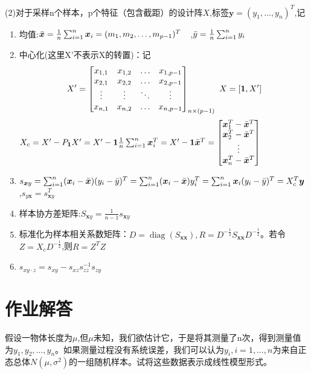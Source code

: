 \documentclass[cn,hazy,green,12pt,normal]{elegantnote}
\DeclareMathOperator{\diag}{diag}
\numberwithin{equation}{section}
\numberwithin{subsection}{section}
\begin{document}
(2)对于采样n个样本，p个特征（包含截距）的设计阵$X$,标签$\bm y=(y_1,\dots,y_n)^T$,记
\begin{enumerate}
    \item 均值:$\Bar{\bm x}=\frac{1}{n}\sum_{i=1}^{n}\bm x_i=(m_1,m_2,\dots,m_{p-1})^T\quad$,$\Bar{y}=\frac{1}{n}\sum_{i=1}^{n}y_i$
    \item 中心化(这里X'不表示X的转置)：记
    \[
    X'=\begin{bmatrix}
x_{1,1} & x_{1,2}  & \dotsc  & x_{1,p-1} \\
 x_{2,1}&x_{2,2}  &\dotsc  & x_{2,p-1}\\
\vdots  & \vdots  & \ddots  & \vdots \\
x_{n,1} & x_{n,2}  & \dotsc  & x_{n,p-1}
\end{bmatrix}_{n\times (p-1)}\\\ X=[\bm 1, X']
    \]
    $X_c=X'-P_{\bm 1}X'=X'-\bm 1 \frac{1}{n}\sum_{i=1}^{n}\bm x_i^T=X'-\bm 1 \Bar{\bm x}^T=\begin{bmatrix}
        \bm x_1^T-\Bar{\bm x}^T\\
        \bm x_2^T-\Bar{\bm x}^T\\
        \vdots \\
        \bm x_n^T-\Bar{\bm x}^T
    \end{bmatrix}$
    \item $s_{\bm x y}=\sum_{i=1}^{n} (\bm x_i-\Bar{\bm x}) (y_i-\Bar{y})^T=\sum_{i=1}^{n} (\bm x_i-\Bar{\bm x})y_i^T=\sum_{i=1}^{n} \bm x_i (y_i-\Bar{y})^T=X_c^T\bm y \,$ ,$ s_{y \bm x}=s_{\bm x y}^T$
    \item 样本协方差矩阵:$S_{\bm x y}=\frac{1}{n-1}s_{\bm x y}$
    \item 标准化为样本相关系数矩阵：$D=\diag(S_{\bm x\bm x}),R=D^{-\frac{1}{2}}S_{\bm x \bm x}D^{-\frac{1}{2}}$。若令$Z=X_cD^{-\frac{1}{2}}$,则$R=Z^TZ$
    \item $s_{xy\cdot z}=s_{xy}-s_{xz}s_{zz}^{-1}s_{zy}$
\end{enumerate}
\section{作业解答}

\begin{homework}
    假设一物体长度为$\mu$,但$\mu$未知，我们欲估计它，于是将其测量了n次，得到测量值为$y_1,y_2,\dots,y_n$。如果测量过程没有系统误差，我们可以认为$y_i,i=1,\dots,n$为来自正态总体$N(\mu,\sigma^2)$的一组随机样本。试将这些数据表示成线性模型形式。
\end{homework}
\end{document}
